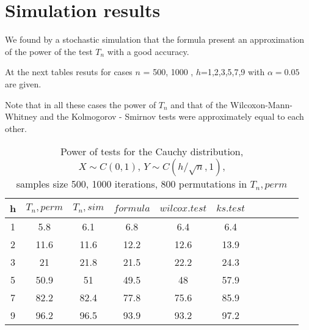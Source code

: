 \documentclass[slidestop,usepdftitle=false]{beamer}
\begin{document}
\section{Simulation results}

 \begin{slide}
 We found by a stochastic simulation that the formula present an approximation of the power of the test $T_n$ with a good accuracy.
 \bigskip

 At the next tables resuts for cases $n$ = 500, 1000 , $h$=1,2,3,5,7,9 with $\alpha=0.05$ are given.

\bigskip

Note that in all these cases the power of  $T_n$ and  that of the Wilcoxon-Mann-Whitney and the
Kolmogorov - Smirnov tests were approximately equal to each other.

\end {slide}

\begin{slide}
\begin{longtable}{|c|c|c|c|c|c|c|c|c|c|c|}
  \caption{Power of tests for the Cauchy distribution, \\
           $X\sim C(0,1)$, $Y\sim C(h/\sqrt{n},1)$, \\
           samples size 500, 1000 iterations, 800 permutations in $T_n, perm$} \\
  \hline
  h & $T_n, perm$ & $T_n, sim$ & $formula$ & $wilcox.test$ & $ks.test$ \\ \hline
  1 & 5.8   & 6.1      & 6.8       & 6.4           & 6.4       \\
  2 & 11.6  & 11.6     & 12.2      & 12.6          & 13.9      \\
  3 & 21    & 21.8     & 21.5      & 22.2          & 24.3      \\
  5 & 50.9  & 51       & 49.5      & 48            & 57.9      \\
  7 & 82.2  & 82.4     & 77.8      & 75.6          & 85.9      \\
  9 & 96.2  & 96.5     & 93.9      & 93.2          & 97.2      \\ \hline
\end{longtable}
\end{slide}
\end{document}
